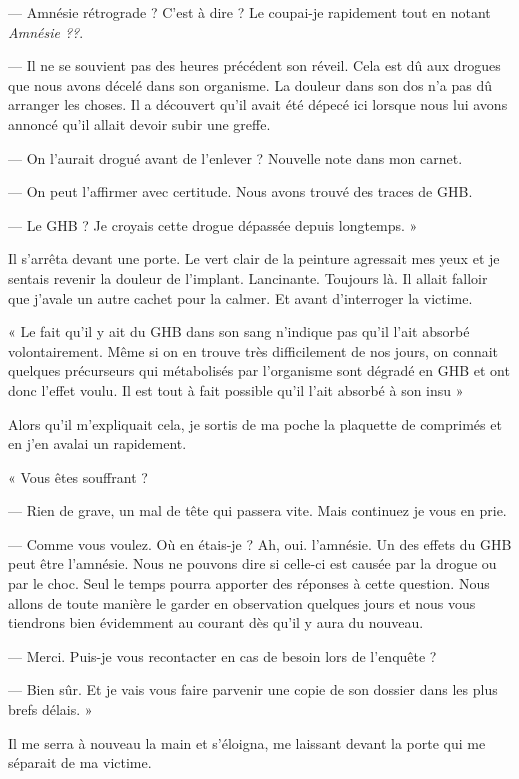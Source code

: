 — Amnésie rétrograde ? C'est à dire ? Le coupai-je rapidement tout en notant \emph{Amnésie ??}.

— Il ne se souvient pas des heures précédent son réveil. Cela est dû aux drogues que nous avons décelé dans son 
organisme. La douleur dans son dos n'a pas dû arranger les choses. Il a découvert qu'il avait été dépecé ici lorsque 
nous lui avons annoncé qu'il allait devoir subir une greffe.

— On l'aurait drogué avant de l'enlever ? Nouvelle note dans mon carnet.

— On peut l'affirmer avec certitude. Nous avons trouvé des traces de GHB.

— Le GHB ? Je croyais cette drogue dépassée depuis longtemps. »

Il s'arrêta devant une porte. Le vert clair de la peinture agressait mes yeux et je sentais revenir la douleur de
l'implant. Lancinante. Toujours là. Il allait falloir que j'avale un autre cachet pour la calmer. Et avant d'interroger
la victime.

« Le fait qu'il y ait du GHB dans son sang n'indique pas qu'il l'ait absorbé volontairement. Même si on en trouve très
difficilement de nos jours, on connait quelques précurseurs qui métabolisés par l'organisme sont dégradé en GHB et ont
donc l'effet voulu. Il est tout à fait possible qu'il l'ait absorbé à son insu »

Alors qu'il m'expliquait cela, je sortis de ma poche la plaquette de comprimés et en j'en avalai un rapidement.

« Vous êtes souffrant ?

— Rien de grave, un mal de tête qui passera vite. Mais continuez je vous en prie.

— Comme vous voulez. Où en étais-je ? Ah, oui. l'amnésie. Un des effets du GHB peut être l'amnésie. Nous ne pouvons
dire si celle-ci est causée par la drogue ou par le choc. Seul le temps pourra apporter des réponses à cette question.
Nous allons de toute manière le garder en observation quelques jours et nous vous tiendrons bien évidemment au courant
dès qu'il y aura du nouveau.

— Merci. Puis-je vous recontacter en cas de besoin lors de l'enquête ?

— Bien sûr. Et je vais vous faire parvenir une copie de son dossier dans les plus brefs délais. »

Il me serra à nouveau la main et s'éloigna, me laissant devant la porte qui me séparait de ma victime.

